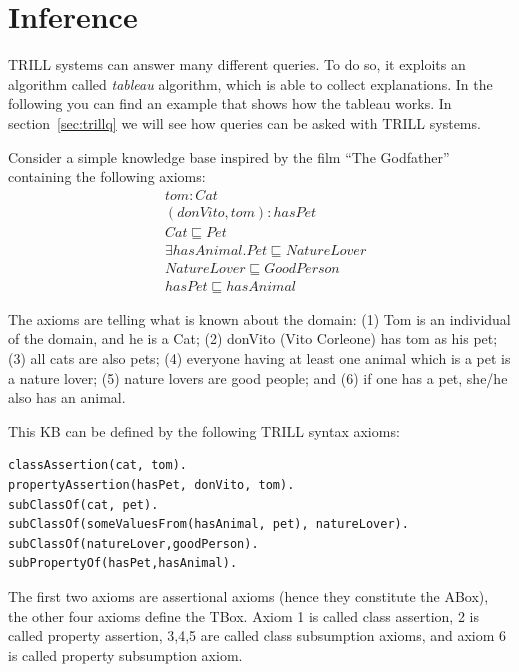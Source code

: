\section{Inference}
\label{inf}

TRILL systems can answer many different queries. To do so, it exploits an algorithm called \emph{tableau} algorithm, which is able to collect explanations. In the following you can find an example that shows how the tableau works. In section~\ref{sec:trillq} we will see how queries can be asked with TRILL systems.

Consider a simple knowledge base inspired by the film ``The Godfather'' containing the following axioms:
\begin{align}
&tom : Cat\\
&(donVito, tom) : hasPet\\
&Cat \sqsubseteq Pet\\
&\exists hasAnimal.Pet \sqsubseteq NatureLover\\
&NatureLover \sqsubseteq GoodPerson\\
&hasPet \sqsubseteq hasAnimal
\end{align}

The axioms are telling what is known about the domain: (1) Tom is an individual of the domain, and he is a Cat; (2) donVito (Vito Corleone) has tom as his pet; (3) all cats are also pets; (4) everyone having at least one animal which is a pet is a nature lover; (5) nature lovers are good people; and (6) if one has a pet, she/he also has an animal.

This KB can be defined by the following TRILL syntax axioms:
\begin{verbatim}
classAssertion(cat, tom).
propertyAssertion(hasPet, donVito, tom).
subClassOf(cat, pet).
subClassOf(someValuesFrom(hasAnimal, pet), natureLover).
subClassOf(natureLover,goodPerson).
subPropertyOf(hasPet,hasAnimal).
\end{verbatim}

The first two axioms are assertional axioms (hence they constitute the ABox), the other four axioms define the TBox. Axiom 1 is called class assertion, 2 is called property assertion, 3,4,5 are called class subsumption axioms, and axiom 6 is called property subsumption axiom.

